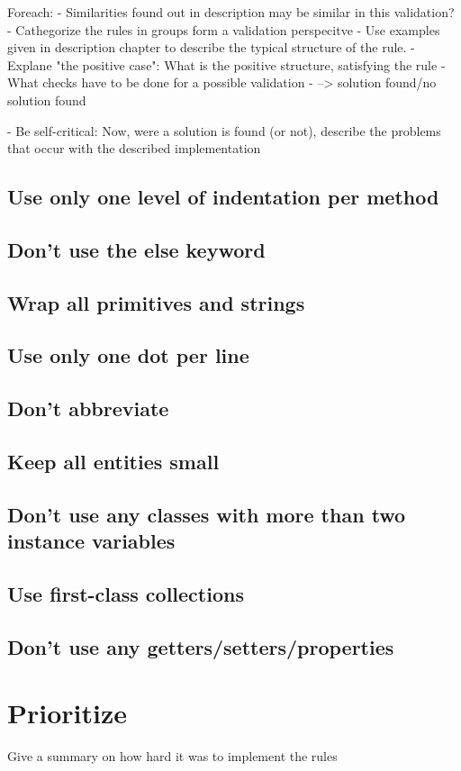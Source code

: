 Foreach: 
 - Similarities found out in description may be similar in this validation?
 - Cathegorize the rules in groups form a validation perspecitve
 - Use examples given in description chapter to describe the typical structure of the rule. 
 - Explane "the positive case": What is the positive structure, satisfying the rule
 - What checks have to be done for a possible validation
 - --> solution found/no solution found
 
 - Be self-critical: Now, were a solution is found (or not), describe the problems that occur with the described implementation
\subsection{Use only one level of indentation per method}
\subsection{Don’t use the else keyword}
\subsection{Wrap all primitives and strings}
\subsection{Use only one dot per line}
\subsection{Don't abbreviate}
\subsection{Keep all entities small}
\subsection{Don't use any classes with more than two instance variables}
\subsection{Use first-class collections}
\subsection{Don’t use any getters/setters/properties}
\section{Prioritize}
Give a summary on how hard it was to implement the rules

